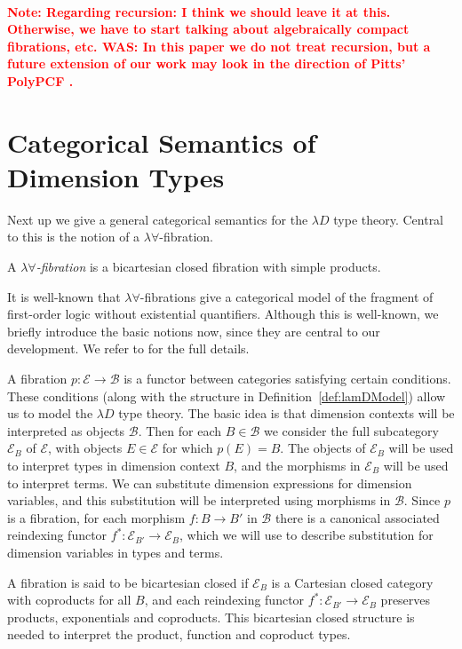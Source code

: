 \documentclass[a4paper,UKenglish]{lipics}
\newcommand\note[1]{{ \bf \textcolor{red} {\vspace{2mm}\; \\ Note: #1\\}}}
\newcommand{\B}{\mathcal{B}}
\newcommand{\E}{\mathcal{E}}
\begin{document}
\note{Regarding recursion: I think we should leave it at this.
Otherwise, we have to start talking about algebraically compact fibrations, etc. WAS: In this paper we do not treat recursion, but a future extension of our work may look in the direction of Pitts' PolyPCF \cite{pitts2000parametric}.}





\section{Categorical Semantics of Dimension Types} \label{sec:sem}
Next up we give a general categorical semantics for the $\lambda D$ type theory. Central to this is the notion of a $\lambda \forall$-fibration.

\begin{definition}
A \emph{$\lambda\forall$-fibration} is a bicartesian closed fibration with simple products.
\end{definition}

It is well-known that $\lambda \forall$-fibrations give a categorical model of the fragment of first-order logic without existential quantifiers. Although this is well-known, we briefly introduce the basic notions now, since they are central to our development. We refer to \cite{jacobs1999categorical} for the full details.

A fibration $p:\E\to\B$ is a functor between categories satisfying certain conditions. These conditions (along with the structure in Definition~\ref{def:lamDModel}) allow us to model the $\lambda D$ type theory. The basic idea is that dimension contexts will be interpreted as objects $\B$. Then for each $B\in\B$ we consider the full subcategory $\E_B$ of $\E$, with objects $E\in\E$ for which $p(E)=B$. The objects of $\E_B$ will be used to interpret types in dimension context $B$, and the morphisms in $\E_B$ will be used to interpret terms. We can substitute dimension expressions for dimension variables, and this substitution will be interpreted using morphisms in $\B$. Since $p$ is a fibration, for each morphism $f:B\to B'$ in $\B$ there is a canonical associated reindexing functor $f^\ast:\E_{B'}\to \E_B$, which we will use to describe substitution for dimension variables in types and terms.

A fibration is said to be bicartesian closed if $\E_B$ is a Cartesian closed category with coproducts for all $B$, and each reindexing functor $f^*:\E_{B'}\to\E_B$ preserves products, exponentials and coproducts. This bicartesian closed structure is needed to interpret the product, function and coproduct types.
\end{document}
